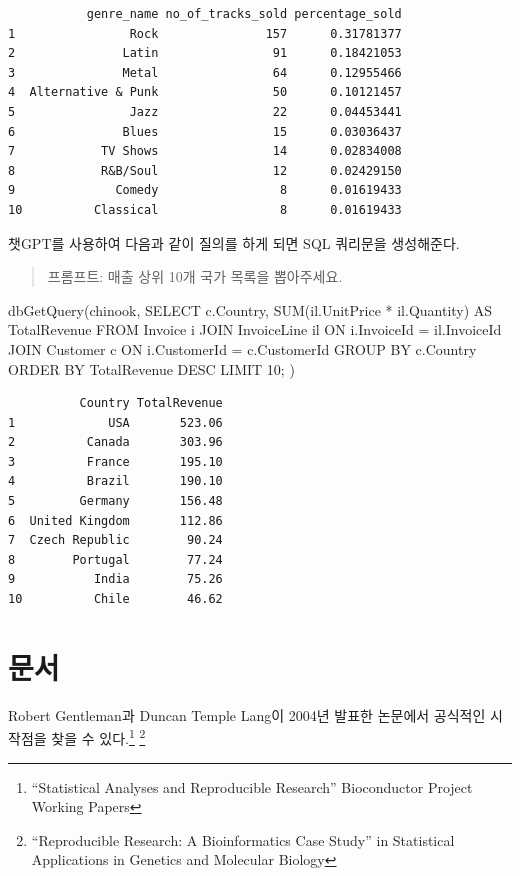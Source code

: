 \documentclass[
  letterpaper,
  chapter,a4paper,showtrims,openright,hidelinks]{oblivoir}
\newenvironment{Shaded}{\begin{snugshade}}{\end{snugshade}}
\newcommand{\FunctionTok}[1]{\textcolor[rgb]{0.28,0.35,0.67}{#1}}
\newcommand{\NormalTok}[1]{\textcolor[rgb]{0.00,0.23,0.31}{#1}}
\newcommand{\StringTok}[1]{\textcolor[rgb]{0.13,0.47,0.30}{#1}}
\begin{document}
\begin{verbatim}
           genre_name no_of_tracks_sold percentage_sold
1                Rock               157      0.31781377
2               Latin                91      0.18421053
3               Metal                64      0.12955466
4  Alternative & Punk                50      0.10121457
5                Jazz                22      0.04453441
6               Blues                15      0.03036437
7            TV Shows                14      0.02834008
8            R&B/Soul                12      0.02429150
9              Comedy                 8      0.01619433
10          Classical                 8      0.01619433
\end{verbatim}

챗GPT를 사용하여 다음과 같이 질의를 하게 되면 SQL 쿼리문을 생성해준다.

\begin{quote}
프롬프트: 매출 상위 10개 국가 목록을 뽑아주세요.
\end{quote}

\begin{Shaded}
\begin{Highlighting}[]
\FunctionTok{dbGetQuery}\NormalTok{(chinook, }\StringTok{\textquotesingle{}}
\StringTok{  SELECT }
\StringTok{      c.Country,}
\StringTok{      SUM(il.UnitPrice * il.Quantity) AS TotalRevenue}
\StringTok{  FROM Invoice i}
\StringTok{  JOIN InvoiceLine il ON i.InvoiceId = il.InvoiceId}
\StringTok{  JOIN Customer c ON i.CustomerId = c.CustomerId}
\StringTok{  GROUP BY c.Country}
\StringTok{  ORDER BY TotalRevenue DESC}
\StringTok{  LIMIT 10;}
\StringTok{\textquotesingle{}}\NormalTok{)}
\end{Highlighting}
\end{Shaded}

\begin{verbatim}
          Country TotalRevenue
1             USA       523.06
2          Canada       303.96
3          France       195.10
4          Brazil       190.10
5         Germany       156.48
6  United Kingdom       112.86
7  Czech Republic        90.24
8        Portugal        77.24
9           India        75.26
10          Chile        46.62
\end{verbatim}

\hypertarget{uxbb38uxc11c}{%
\chapter{문서}\label{uxbb38uxc11c}}

Robert Gentleman과 Duncan Temple Lang이 2004년 발표한 논문에서 공식적인
시작점을 찾을 수 있다.\footnote{``Statistical Analyses and Reproducible
  Research'' Bioconductor Project Working Papers} \footnote{``Reproducible
  Research: A Bioinformatics Case Study'' in Statistical Applications in
  Genetics and Molecular Biology}
\end{document}
